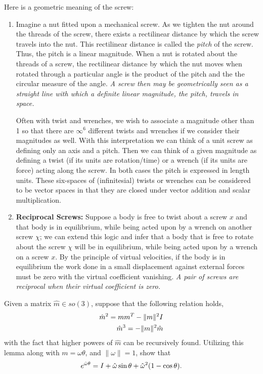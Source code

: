 \noindent \begin{solution}
	Here is a geometric meaning of the screw:
	\begin{enumerate}
		\item 
		Imagine a nut fitted upon a mechanical screw. As we tighten the nut around the threads of the screw, there exists a rectilinear distance by which the screw travels into the nut. This rectilinear distance is called the \textit{pitch} of the screw. Thus, the pitch is a linear magnitude. When a nut is rotated about the threads of a screw, the rectilinear distance by which the nut moves when rotated through a particular angle is the product of the pitch and the the circular measure of the angle. \textit{A screw then may be geometrically seen as a straight line with which a definite linear magnitude, \ie the pitch, travels in space.}
		
		Often with twist and wrenches, we wish to associate a magnitude other than 1 so that there are $\infty^6$ different twists and wrenches if we consider their magnitudes as well. With this interpretation we can think of a unit screw as defining only an axis and a pitch. Then we can think of a given magnitude as defining a twist (if its units are rotation/time) or a wrench (if its units are force) acting along the screw. In both cases the pitch is expressed in length units. These six-spaces of (infinitesial) twists or wrenches can be considered to be vector spaces in that they are closed under vector addition and scalar multiplication.
		\item \textbf{Reciprocal Screws:} Suppose a body is free to twist about a screw $x$ and that body is in equilibrium, while being acted upon by a wrench on another screw $\chi$; we can extend this logic and infer that a body that is free to rotate about the screw $\chi$ will be in equilibrium, while being acted upon by a wrench on a screw $x$. By the principle of virtual velocities, if the body is in equilibrium the work done in a small displacement against external forces must be zero with the virtual coefficient vanishing. %
		\textit{A pair of screws are reciprocal when their virtual coefficient is zero.}
	\end{enumerate}
\end{solution}


\noindent 
\begin{homework}
	Given a matrix $\hat{m} \in so(3)$, suppose that the following relation holds,
	\begin{align}
	\hat{m}^2 = m m^T - \|m\|^2 I \\
	\hat{m}^3 = - \|m\|^2 \hat{m}
	\end{align}
	with the fact that higher powers of $\hat{m}$ can be recursively found. Utilizing this lemma along with $m =\omega \theta$, and $\|\omega\| = 1$, show that 
	\begin{align}
	e^{\hat{\omega}\theta}  = \identity + \hat{\omega} \sin \theta + \hat{\omega}^2(1 - \cos \theta).
	\label{eq:rodrigues}
	\end{align}
\end{homework} 

